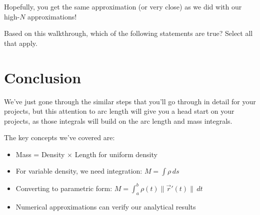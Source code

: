 \documentclass{ximera}
\begin{document}
Hopefully, you get the same approximation (or very close) as we did with our high-$N$ approximations!

\begin{problem}
Based on this walkthrough, which of the following statements are true? Select all that apply.

\begin{selectAll}
\end{selectAll}
\end{problem}

\section*{Conclusion}

We've just gone through the similar steps that you'll go through in detail for your projects, but this attention to arc length will give you a head start on your projects, as those integrals will build on the arc length and mass integrals.

The key concepts we've covered are:
\begin{itemize}
\item Mass = Density $\times$ Length for uniform density
\item For variable density, we need integration: $M = \int \rho \, ds$
\item Converting to parametric form: $M = \int_a^b \rho(t) \|\vec{r}'(t)\| \, dt$
\item Numerical approximations can verify our analytical results
\end{itemize}
\end{document}
